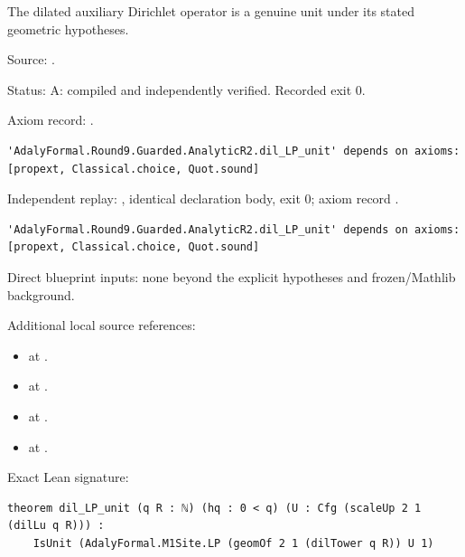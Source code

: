 \begin{theorem}[bp-089]
\label{bp-089}
\uses{}
\leanok
The dilated auxiliary Dirichlet operator is a genuine unit under its stated geometric hypotheses.

\par Source: \texttt{}.
\par Status: A: compiled and independently verified. Recorded exit 0.
\par Axiom record: \texttt{}.
\begin{verbatim}
'AdalyFormal.Round9.Guarded.AnalyticR2.dil_LP_unit' depends on axioms: [propext, Classical.choice, Quot.sound]
\end{verbatim}
\par Independent replay: \texttt{}, identical declaration body, exit 0; axiom record \texttt{}.
\begin{verbatim}
'AdalyFormal.Round9.Guarded.AnalyticR2.dil_LP_unit' depends on axioms: [propext, Classical.choice, Quot.sound]
\end{verbatim}
\par Direct blueprint inputs: none beyond the explicit hypotheses and frozen/Mathlib background.
\par Additional local source references:
\begin{itemize}
\item \texttt{} at \texttt{}.
\item \texttt{} at \texttt{}.
\item \texttt{} at \texttt{}.
\item \texttt{} at \texttt{}.
\end{itemize}
\par Exact Lean signature:
\begin{verbatim}
theorem dil_LP_unit (q R : ℕ) (hq : 0 < q) (U : Cfg (scaleUp 2 1 (dilLu q R))) :
    IsUnit (AdalyFormal.M1Site.LP (geomOf 2 1 (dilTower q R)) U 1)
\end{verbatim}
\end{theorem}

